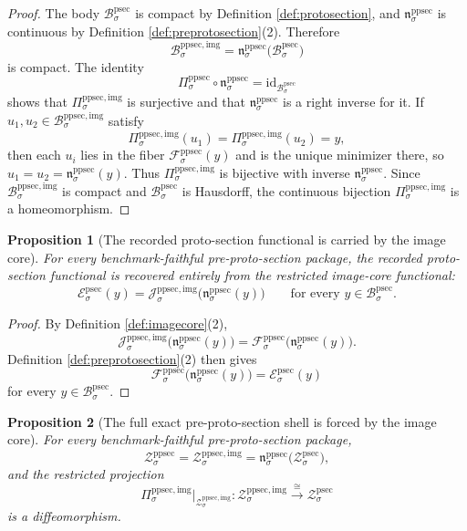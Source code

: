 \documentclass[11pt]{article}
\newcommand{\ProtoSectionBody}[1]{\mathcal B_{#1}^{\mathrm{psec}}}
\newcommand{\ProtoSectionFunctional}[1]{\mathscr E_{#1}^{\mathrm{psec}}}
\newcommand{\ProtoSectionShell}[1]{\mathcal Z_{#1}^{\mathrm{psec}}}
\newcommand{\PreProtoSectionProj}[1]{\Pi_{#1}^{\mathrm{ppsec}}}
\newcommand{\PreProtoSectionFiber}[2]{\mathcal F_{#1}^{\mathrm{ppsec}}(#2)}
\newcommand{\PreProtoSectionProtoMin}[1]{\mathfrak n_{#1}^{\mathrm{ppsec}}}
\newcommand{\PreProtoSectionFunctional}[1]{\mathscr F_{#1}^{\mathrm{ppsec}}}
\newcommand{\PreProtoSectionShell}[1]{\mathcal Z_{#1}^{\mathrm{ppsec}}}
\newcommand{\PreProtoSectionImgBody}[1]{\mathcal B_{#1}^{\mathrm{ppsec,img}}}
\newcommand{\PreProtoSectionImgProj}[1]{\Pi_{#1}^{\mathrm{ppsec,img}}}
\newcommand{\PreProtoSectionImgFunctional}[1]{\mathscr J_{#1}^{\mathrm{ppsec,img}}}
\newcommand{\PreProtoSectionImgShell}[1]{\mathcal Z_{#1}^{\mathrm{ppsec,img}}}
\newtheorem{proposition}{Proposition}
\begin{document}
\begin{proof}
The body \(\ProtoSectionBody{\sigma}\) is compact by Definition \ref{def:protosection}, and \(\PreProtoSectionProtoMin{\sigma}\) is continuous by Definition \ref{def:preprotosection}(2). Therefore
\[
\PreProtoSectionImgBody{\sigma}
=
\PreProtoSectionProtoMin{\sigma}\bigl(\ProtoSectionBody{\sigma}\bigr)
\]
is compact. The identity
\[
\PreProtoSectionProj{\sigma}\circ\PreProtoSectionProtoMin{\sigma}
=
\mathrm{id}_{\ProtoSectionBody{\sigma}}
\]
shows that \(\PreProtoSectionImgProj{\sigma}\) is surjective and that \(\PreProtoSectionProtoMin{\sigma}\) is a right inverse for it. If \(u_{1},u_{2}\in\PreProtoSectionImgBody{\sigma}\) satisfy
\[
\PreProtoSectionImgProj{\sigma}(u_{1})=\PreProtoSectionImgProj{\sigma}(u_{2})=y,
\]
then each \(u_{i}\) lies in the fiber \(\PreProtoSectionFiber{\sigma}{y}\) and is the unique minimizer there, so \(u_{1}=u_{2}=\PreProtoSectionProtoMin{\sigma}(y)\). Thus \(\PreProtoSectionImgProj{\sigma}\) is bijective with inverse \(\PreProtoSectionProtoMin{\sigma}\). Since \(\PreProtoSectionImgBody{\sigma}\) is compact and \(\ProtoSectionBody{\sigma}\) is Hausdorff, the continuous bijection \(\PreProtoSectionImgProj{\sigma}\) is a homeomorphism.
\end{proof}

\begin{proposition}[The recorded proto-section functional is carried by the image core]
\label{prop:functional}
For every benchmark-faithful pre-proto-section package, the recorded proto-section functional is recovered entirely from the restricted image-core functional:
\[
\ProtoSectionFunctional{\sigma}(y)
=
\PreProtoSectionImgFunctional{\sigma}\bigl(\PreProtoSectionProtoMin{\sigma}(y)\bigr)
\qquad
\text{for every }y\in\ProtoSectionBody{\sigma}.
\]
\end{proposition}

\begin{proof}
By Definition \ref{def:imagecore}(2),
\[
\PreProtoSectionImgFunctional{\sigma}\bigl(\PreProtoSectionProtoMin{\sigma}(y)\bigr)
=
\PreProtoSectionFunctional{\sigma}\bigl(\PreProtoSectionProtoMin{\sigma}(y)\bigr).
\]
Definition \ref{def:preprotosection}(2) then gives
\[
\PreProtoSectionFunctional{\sigma}\bigl(\PreProtoSectionProtoMin{\sigma}(y)\bigr)
=
\ProtoSectionFunctional{\sigma}(y)
\]
for every \(y\in\ProtoSectionBody{\sigma}\).
\end{proof}

\begin{proposition}[The full exact pre-proto-section shell is forced by the image core]
\label{prop:shell}
For every benchmark-faithful pre-proto-section package,
\[
\PreProtoSectionShell{\sigma}
=
\PreProtoSectionImgShell{\sigma}
=
\PreProtoSectionProtoMin{\sigma}\bigl(\ProtoSectionShell{\sigma}\bigr),
\]
and the restricted projection
\[
\PreProtoSectionImgProj{\sigma}\big|_{\PreProtoSectionImgShell{\sigma}}
:
\PreProtoSectionImgShell{\sigma}\xrightarrow{\cong}\ProtoSectionShell{\sigma}
\]
is a diffeomorphism.
\end{proposition}
\end{document}
